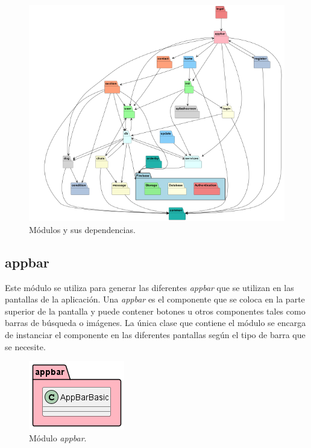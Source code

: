 \documentclass[a4paper, 12pt]{article}
\begin{document}
\begin{figure}[H]
	\begin{center}
		{\includegraphics[width=13cm]{diagram/MODULES.png}\par}
		\caption{Módulos y sus dependencias.}
	\end{center}
\end{figure}


\newpage
\subsection*{appbar}


Este módulo se utiliza para generar las diferentes \textit{appbar} que se utilizan en las pantallas de la aplicación. Una \textit{appbar} es el componente que se coloca en la parte superior de la pantalla y puede contener botones u otros componentes tales como barras de búsqueda o imágenes. La única clase que contiene el módulo se encarga de instanciar el componente en las diferentes pantallas según el tipo de barra que se necesite.

\begin{figure}[H]
	\begin{center}
		{\includegraphics[]{diagram/AppBar.png}\par}
		\caption{Módulo \textit{appbar}.}
	\end{center}
\end{figure}
\end{document}
